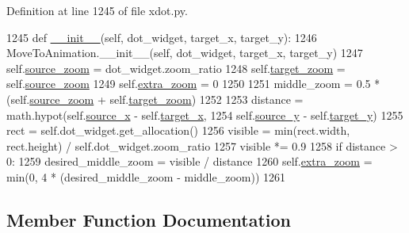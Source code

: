 Definition at line 1245 of file xdot.\+py.


\begin{DoxyCode}
1245     \textcolor{keyword}{def }\hyperlink{classsmacc__viewer_1_1xdot_1_1xdot_1_1ZoomToAnimation_a2c6dc0e3f10e930403e1e15b1ffa113b}{\_\_init\_\_}(self, dot\_widget, target\_x, target\_y):
1246         MoveToAnimation.\_\_init\_\_(self, dot\_widget, target\_x, target\_y)
1247         self.\hyperlink{classsmacc__viewer_1_1xdot_1_1xdot_1_1ZoomToAnimation_af0fc17c1b5ec4e90e75cd3bc47ddbc81}{source\_zoom} = dot\_widget.zoom\_ratio
1248         self.\hyperlink{classsmacc__viewer_1_1xdot_1_1xdot_1_1ZoomToAnimation_aef95c13584eeffb5d9028c376dc9fd4b}{target\_zoom} = self.\hyperlink{classsmacc__viewer_1_1xdot_1_1xdot_1_1ZoomToAnimation_af0fc17c1b5ec4e90e75cd3bc47ddbc81}{source\_zoom}
1249         self.\hyperlink{classsmacc__viewer_1_1xdot_1_1xdot_1_1ZoomToAnimation_a77a1b495b0e59070847457f11f8ade53}{extra\_zoom} = 0
1250 
1251         middle\_zoom = 0.5 * (self.\hyperlink{classsmacc__viewer_1_1xdot_1_1xdot_1_1ZoomToAnimation_af0fc17c1b5ec4e90e75cd3bc47ddbc81}{source\_zoom} + self.\hyperlink{classsmacc__viewer_1_1xdot_1_1xdot_1_1ZoomToAnimation_aef95c13584eeffb5d9028c376dc9fd4b}{target\_zoom})
1252 
1253         distance = math.hypot(self.\hyperlink{classsmacc__viewer_1_1xdot_1_1xdot_1_1MoveToAnimation_af362b035e9461c4036f756bba60a5e3b}{source\_x} - self.\hyperlink{classsmacc__viewer_1_1xdot_1_1xdot_1_1MoveToAnimation_a5ea1e33ebe1d6ab9bfa86a336b3a2524}{target\_x},
1254                               self.\hyperlink{classsmacc__viewer_1_1xdot_1_1xdot_1_1MoveToAnimation_a40825c7f41d700635425cd40fca1f6a4}{source\_y} - self.\hyperlink{classsmacc__viewer_1_1xdot_1_1xdot_1_1MoveToAnimation_af354769fa237bb3f62cf02d9ca92da4f}{target\_y})
1255         rect = self.dot\_widget.get\_allocation()
1256         visible = min(rect.width, rect.height) / self.dot\_widget.zoom\_ratio
1257         visible *= 0.9
1258         \textcolor{keywordflow}{if} distance > 0:
1259             desired\_middle\_zoom = visible / distance
1260             self.\hyperlink{classsmacc__viewer_1_1xdot_1_1xdot_1_1ZoomToAnimation_a77a1b495b0e59070847457f11f8ade53}{extra\_zoom} = min(0, 4 * (desired\_middle\_zoom - middle\_zoom))
1261 
\end{DoxyCode}


\subsection{Member Function Documentation}
